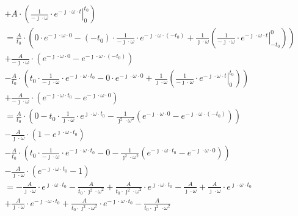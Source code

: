 \begin{task}
\begin{align*}
&+ A\cdot \left( \left. \frac{1}{-\jmath \cdot \omega}\cdot e^{ -\jmath \cdot \omega \cdot t} \right|_{0}^{t_{0}}\right)\\
&=\frac{A}{t_{0}}\cdot \left( 0 \cdot e^{-\jmath \cdot \omega \cdot 0} - (-t_{0}) \cdot \frac{1}{-\jmath \cdot \omega}\cdot e^{ -\jmath \cdot \omega \cdot (-t_{0})} %
+ \frac{1}{\jmath \cdot \omega} \left( \left. \frac{1}{-\jmath \cdot \omega}\cdot e^{ -\jmath \cdot \omega \cdot t} \right|_{-t_{0}}^{0}\right)\right)\\
&+ \frac{A}{-\jmath \cdot \omega} \cdot \left( e^{ -\jmath \cdot \omega \cdot 0} - e^{ -\jmath \cdot \omega \cdot (-t_{0})} \right)\\
&-\frac{A}{t_{0}}\cdot \left(t_{0} \cdot \frac{1}{-\jmath \cdot \omega}\cdot e^{ -\jmath \cdot \omega \cdot t_{0}} - 0 \cdot e^{-\jmath \cdot \omega \cdot 0} 
+ \frac{1}{\jmath \cdot \omega} \left( \left. \frac{1}{-\jmath \cdot \omega}\cdot e^{ -\jmath \cdot \omega \cdot t} \right|_{0}^{t_{0}}\right)\right)\\
&+ \frac{A}{-\jmath \cdot \omega} \cdot \left( e^{ -\jmath \cdot \omega \cdot t_{0}} - e^{ -\jmath \cdot \omega \cdot 0} \right)\\
&=\frac{A}{t_{0}}\cdot \left( 0 - t_{0} \cdot \frac{1}{\jmath \cdot \omega}\cdot e^{ \jmath \cdot \omega \cdot t_{0}} %
- \frac{1}{\jmath^{2} \cdot \omega^{2}} \left( e^{ -\jmath \cdot \omega \cdot 0} - e^{ -\jmath \cdot \omega \cdot (-t_{0})} \right)\right)\\
&- \frac{A}{\jmath \cdot \omega} \cdot \left( 1 - e^{ \jmath \cdot \omega \cdot t_{0}} \right)\\
&-\frac{A}{t_{0}}\cdot \left(t_{0} \cdot \frac{1}{-\jmath \cdot \omega}\cdot e^{ -\jmath \cdot \omega \cdot t_{0}} - 0 
- \frac{1}{\jmath^{2} \cdot \omega^{2}} \left(e^{ -\jmath \cdot \omega \cdot t_{0}}-e^{ -\jmath \cdot \omega \cdot 0}\right)\right)\\
&- \frac{A}{\jmath \cdot \omega} \cdot \left( e^{ -\jmath \cdot \omega \cdot t_{0}} - 1\right)\\
&=-\frac{A}{\jmath \cdot \omega} \cdot e^{ \jmath \cdot \omega \cdot t_{0}} - \frac{A}{t_{0} \cdot \jmath^{2} \cdot \omega^{2}} + \frac{A}{t_{0} \cdot \jmath^{2} \cdot \omega^{2}} \cdot e^{ \jmath \cdot \omega \cdot t_{0}} %
- \frac{A}{\jmath \cdot \omega} + \frac{A}{\jmath \cdot \omega} \cdot e^{ \jmath \cdot \omega \cdot t_{0}}\\
&+\frac{A}{\jmath \cdot \omega} \cdot e^{ -\jmath \cdot \omega \cdot t_{0}}  + \frac{A}{t_{0} \cdot \jmath^{2} \cdot \omega^{2}} \cdot e^{- \jmath \cdot \omega \cdot t_{0}} - \frac{A}{t_{0} \cdot \jmath^{2} \cdot \omega^{2}}

\end{align*}
\end{task}

